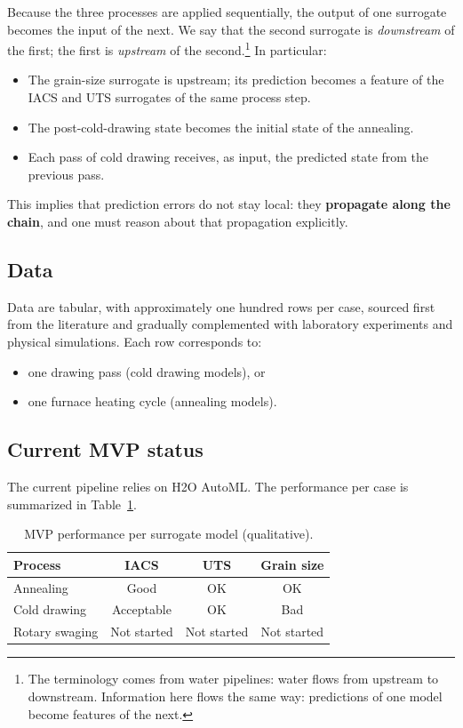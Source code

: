 \documentclass[11pt,a4paper]{article}
\begin{document}
Because the three processes are applied sequentially, the output of one surrogate becomes the input of the next. We say that the second surrogate is \emph{downstream} of the first; the first is \emph{upstream} of the second.\footnote{The terminology comes from water pipelines: water flows from upstream to downstream. Information here flows the same way: predictions of one model become features of the next.} In particular:
\begin{itemize}
    \item The grain-size surrogate is upstream; its prediction becomes a feature of the IACS and UTS surrogates of the same process step.
    \item The post-cold-drawing state becomes the initial state of the annealing.
    \item Each pass of cold drawing receives, as input, the predicted state from the previous pass.
\end{itemize}
This implies that prediction errors do not stay local: they \textbf{propagate along the chain}, and one must reason about that propagation explicitly.

\subsection{Data}

Data are tabular, with approximately one hundred rows per case, sourced first from the literature and gradually complemented with laboratory experiments and physical simulations. Each row corresponds to:
\begin{itemize}
    \item one drawing pass (cold drawing models), or
    \item one furnace heating cycle (annealing models).
\end{itemize}

\subsection{Current MVP status}

The current pipeline relies on H2O AutoML. The performance per case is summarized in Table~\ref{tab:status}.

\begin{table}[h]
\centering
\begin{tabular}{lccc}
\toprule
\textbf{Process} & \textbf{IACS} & \textbf{UTS} & \textbf{Grain size} \\
\midrule
Annealing       & Good        & OK   & OK \\
Cold drawing    & Acceptable  & OK   & Bad \\
Rotary swaging  & Not started & Not started & Not started \\
\bottomrule
\end{tabular}
\caption{MVP performance per surrogate model (qualitative).}
\label{tab:status}
\end{table}
\end{document}

